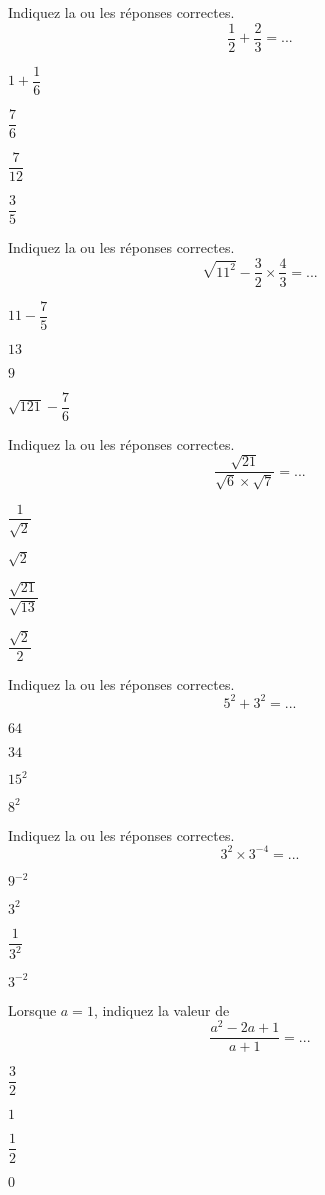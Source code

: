 \documentclass[a4paper,10pt]{article}
\begin{document}
\begin{qcm}

	\q{} Indiquez la ou les réponses correctes. $$ \dfrac{1}{2}+\dfrac{2}{3}=...$$
	\begin{choix2col}
		\item $1+\dfrac{1}{6}$
		\item $\dfrac{7}{6}$
		\item $\dfrac{7}{12}$
		\item $\dfrac{3}{5}$
	\end{choix2col}
	
	\q{} Indiquez la ou les réponses correctes. $$ \sqrt{11^2}-\dfrac{3}{2}\times\dfrac{4}{3}=...$$
	\begin{choix2col}
		\item $11-\dfrac{7}{5}$
		\item $13$
		\item $9$
		\item $\sqrt{121}-\dfrac{7}{6}$
	\end{choix2col}
	
	\q{} Indiquez la ou les réponses correctes. $$\dfrac{\sqrt{21}}{\sqrt{6}\times\sqrt{7}}=...$$
	\begin{choix2col}
		\item $\dfrac{1}{\sqrt{2}}$
		\item $\sqrt{2}$
		\item $\dfrac{\sqrt{21}}{\sqrt{13}}$
		\item $\dfrac{\sqrt{2}}{2}$
	\end{choix2col}
	
	\q{} Indiquez la ou les réponses correctes. $$5^2+3^2=...$$
	\begin{choix2col}
		\item $64$
		\item $34$
		\item $15^2$
		\item $8^2$
	\end{choix2col}
	
	\q{} Indiquez la ou les réponses correctes. $$3^2\times3^{-4}=...$$
	\begin{choix2col}
		\item $9^{-2}$
		\item $3^2$
		\item $\dfrac{1}{3^2}$
		\item $3^{-2}$
	\end{choix2col}
	
	\q{} Lorsque $a=1$, indiquez la valeur de $$\dfrac{a^2-2a+1}{a+1}=...$$
	\begin{choix2col}
		\item $\dfrac{3}{2}$
		\item $1$
		\item $\dfrac{1}{2}$
		\item $0$
	\end{choix2col}
	

\end{qcm}
\end{document}
